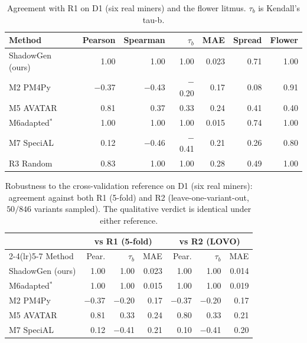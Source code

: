 \documentclass[runningheads]{llncs}
\newcommand{\chg}[1]{\textcolor{chgblue}{#1}}
\begin{document}
\begin{table}[t]
\centering
\caption{Agreement with R1 on D1 (six real miners) and the flower litmus. $\tau_b$ is Kendall's tau-b.}
\label{tab:corr}
\setlength{\tabcolsep}{4.5pt}
\footnotesize
\begin{tabular}{@{}lrrrrrr@{}}
\toprule
Method & Pearson & Spearman & $\tau_b$ & MAE & Spread & Flower \\
\midrule
\chg{ShadowGen (ours)}  & 1.00 & 1.00 & 1.00 & 0.023 & 0.71 & 1.00 \\
M2 PM4Py         & $-$0.37 & $-$0.43 & $-$0.20 & 0.17 & 0.08 & 0.91 \\
M5 AVATAR        & 0.81 & 0.37 & 0.33 & 0.24 & 0.41 & 0.40 \\
M6adapted$^{*}$ & 1.00 & 1.00 & 1.00 & 0.015 & 0.74 & 1.00 \\
M7 SpeciAL       & 0.12 & $-$0.46 & $-$0.41 & 0.21 & 0.26 & 0.80 \\
R3 Random        & 0.83 & 1.00 & 1.00 & 0.28 & 0.49 & 1.00 \\
\bottomrule
\end{tabular}
\end{table}

\begin{table}[t]
\centering
\caption{Robustness to the cross-validation reference on D1 (six real miners): agreement against both R1 (5-fold) and R2 (leave-one-variant-out, $50/846$ variants sampled). The qualitative verdict is identical under either reference.}
\label{tab:r2}
\setlength{\tabcolsep}{5pt}
\footnotesize
\begin{tabular}{@{}lrrrrrr@{}}
\toprule
 & \multicolumn{3}{c}{vs R1 (5-fold)} & \multicolumn{3}{c}{vs R2 (LOVO)} \\
\cmidrule(lr){2-4}\cmidrule(lr){5-7}
Method & Pear. & $\tau_b$ & MAE & Pear. & $\tau_b$ & MAE \\
\midrule
\chg{ShadowGen (ours)}    & 1.00 & 1.00 & 0.023 & 1.00 & 1.00 & 0.014 \\
M6adapted$^{*}$ & 1.00 & 1.00 & 0.015 & 1.00 & 1.00 & 0.019 \\
M2 PM4Py           & $-$0.37 & $-$0.20 & 0.17 & $-$0.37 & $-$0.20 & 0.17 \\
M5 AVATAR          & 0.81 & 0.33 & 0.24 & 0.80 & 0.33 & 0.21 \\
M7 SpeciAL         & 0.12 & $-$0.41 & 0.21 & 0.10 & $-$0.41 & 0.20 \\
\bottomrule
\end{tabular}
\end{table}
\end{document}

